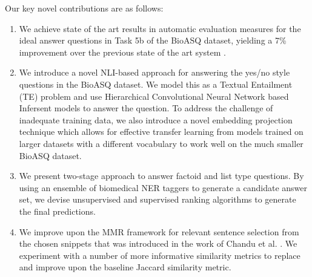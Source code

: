 \documentclass[11pt,a4paper]{article}
\begin{document}
Our key novel contributions are as follows:
\begin{enumerate}
    \item We achieve state of the art results in automatic evaluation measures for the ideal answer questions in Task 5b of the BioASQ dataset, yielding a 7\%  improvement over the previous state of the art system \cite{khyati-paper}.
    \item We introduce a novel NLI-based approach for answering the yes/no style questions in the BioASQ dataset. We model this as a Textual Entailment (TE) problem and use Hierarchical Convolutional Neural Network based Infersent models \cite{Infersent} to answer the question. To address the challenge of inadequate training data, we also introduce a novel embedding projection technique which allows for effective transfer learning from models trained on larger datasets with a different vocabulary to work well on the much smaller BioASQ dataset.
    \item We present two-stage approach to answer factoid and list type questions. By using an ensemble of biomedical NER taggers to generate a candidate answer set, we devise unsupervised and supervised ranking algorithms to generate the final predictions.
    \item We improve upon the MMR framework for relevant sentence selection from the chosen snippets that was introduced in the work of Chandu et al. . We experiment with a number of more informative similarity metrics to replace and improve upon the baseline Jaccard similarity metric.

\end{enumerate}
    
\end{document}
